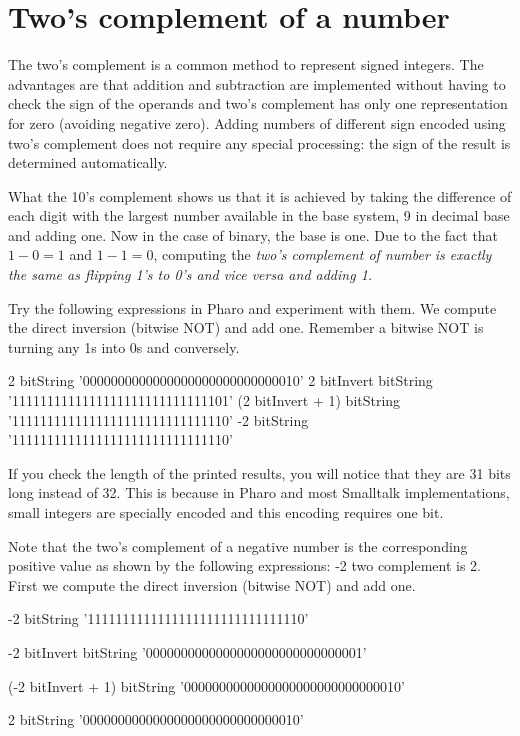 \documentclass[a4paper,10pt,twoside]{book}
\begin{document}
\section{Two's complement of a number}

The two's complement is a common method to represent signed integers. The advantages are that addition and subtraction are implemented without having to  check the sign of the operands and two's complement has only one representation for zero (avoiding negative zero). Adding numbers of different sign encoded using two's complement does not  require any special processing: the sign of the result is determined automatically. 

What the 10's complement shows us  that it is achieved by taking the difference of each digit with the largest number available in the base system, 9 in decimal base and adding one. Now in the case of binary, the base is one.
Due to the fact that $1 - 0 = 1$ and $1 - 1 = 0$, computing the \emph{two's complement of number is exactly the same as flipping 1's to 0's and vice versa and adding 1.}


Try the following expressions in Pharo and experiment with them. We compute the direct inversion (bitwise NOT) and add one. 
Remember a bitwise NOT is turning any 1s into 0s and conversely. 

\begin{code}{}
2 bitString 
			'0000000000000000000000000000010'
2 bitInvert bitString 
			'1111111111111111111111111111101'
(2 bitInvert + 1) bitString 
			'1111111111111111111111111111110'
-2 bitString 
			'1111111111111111111111111111110'		 
\end{code}

If you check the length of the printed results, you will notice that they are 31 bits long instead of 32. This is because in Pharo and most Smalltalk implementations, small integers are specially encoded and this encoding requires one bit.

Note that the two's complement of a negative number is the corresponding positive value as shown by the following expressions: -2 two complement is 2. First we compute the direct inversion (bitwise NOT) and add one. 

\begin{code}{}
-2 bitString 
	'1111111111111111111111111111110'
	
-2 bitInvert bitString  
	'0000000000000000000000000000001'
	
(-2 bitInvert + 1) bitString   
	'0000000000000000000000000000010'

2 bitString 
	'0000000000000000000000000000010'
\end{code}
\end{document}
